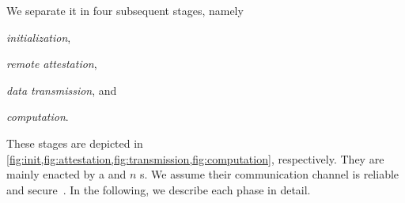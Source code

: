 %

We separate it in four subsequent stages, namely
\begin{inparaenum}
	\item \textit{initialization}, \item \textit{remote attestation}, \item \textit{data transmission}, and \item \textit{computation}.
\end{inparaenum}
These stages are depicted in \cref{fig:init,fig:attestation,fig:transmission,fig:computation}, respectively. They are mainly enacted by a  and $n$ s. We assume their communication channel is reliable~\cite{Cachin.etal/2011:ReliableSecureDistributedProgramming} and secure~\cite{KamilLowe/FAST2010:AbstractionsSecureChannels}. In the following, we describe each phase in detail.

